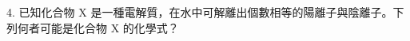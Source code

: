 \documentclass[12pt]{article}
\begin{document}
\begin{problem}
  \item[4.] 已知化合物 X 是一種電解質，在水中可解離出個數相等的陽離子與陰離子。下列何者可能是化合物 X 的化學式？
  \begin{choices}
    \item {}
    \item {}
    \item {}
    \item {}
  \end{choices}
\end{problem}
\end{document}
